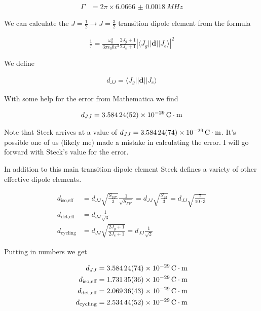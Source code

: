 \documentclass[12pt]{article}
\newcommand{\ep}{\epsilon}
\newcommand{\bv}[1]{\boldsymbol{#1}}
\begin{document}
\begin{align}
\Gamma &= 2\pi \times \SI{6.0666(18)}{MHz}
\end{align}

We can calculate the $J=\frac{1}{2} \rightarrow J=\frac{3}{2}$ transition dipole element from the formula

\begin{align}
\frac{1}{\tau} = \frac{\omega_0^3}{3\pi \ep_0 \hbar c^3} \frac{2J_g+1}{2J_e+1} \left\vert \langle J_g\vert\vert\bv{d}\vert\vert J_e\rangle\right\vert^2
\end{align}

We define

\begin{align}
d_{JJ} =  \langle J_g\vert\vert\bv{d}\vert\vert J_e\rangle
\end{align}

With some help for the error from Mathematica we find

\begin{align}
d_{JJ} = \SI{3.58424(52)d-29}{C\cdot m}
\end{align}

Note that Steck arrives at a value of $d_{JJ} = \SI{3.58424(74)d-29}{C\cdot m}$. It's possible one of us (likely me) made a mistake in calculating the error. I will go forward with Steck's value for the error.

In addition to this main transition dipole element Steck defines a variety of other effective dipole elements.

\begin{align}
d_{\text{iso,eff}} &= d_{JJ} \sqrt{\frac{S_{FF'}}{3}} \frac{1}{\sqrt{S_{FF'}}} = d_{JJ} \sqrt{\frac{S_{23}}{3}} = d_{JJ}\sqrt{\frac{7}{10\cdot3}}\\
d_{\text{det,eff}} &= d_{JJ} \frac{1}{\sqrt{3}}\\
d_{\text{cycling}} &= d_{JJ} \sqrt{\frac{2J_g+1}{2J_e+1}} = d_{JJ}\frac{1}{\sqrt{2}}
\end{align}

Putting in numbers we get

\begin{align}
d_{JJ} &= \SI{3.58424(74)d-29}{C\cdot m}\\
d_{\text{iso,eff}} &= \SI{1.73135(36)d-29}{C\cdot m}\\
d_{\text{det,eff}} &= \SI{2.06936(43)d-29}{C\cdot m}\\
d_{\text{cycling}} &= \SI{2.53444(52)d-29}{C\cdot m}\\
\end{align}
\end{document}

